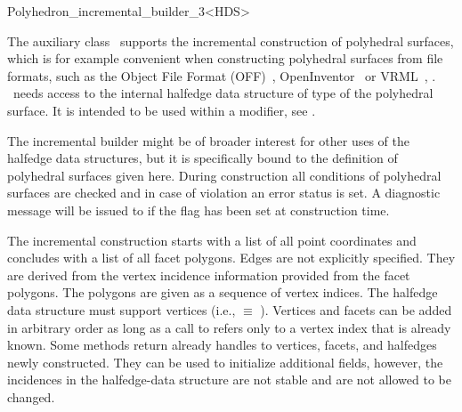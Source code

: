 
\ccRefPageBegin



\begin{ccRefClass}{Polyhedron_incremental_builder_3<HDS>}
\label{pagePolyIncrBuilder}

\ccDefinition
{}
  
The auxiliary class \ccClassTemplateName\ supports the incremental
construction of polyhedral surfaces, which is for example convenient
when constructing polyhedral surfaces from file formats, such as the
Object File Format (OFF)~\cite{cgal:p-gmgv16-96},
OpenInventor~\cite{cgal:w-impoo-94} or 
VRML~\cite{cgal:bpp-vrml-95}, \cite{cgal:vrmls-96}.
\ccClassTemplateName\ needs access to the internal halfedge data
structure of type  of the polyhedral surface. It is intended
to be used within a modifier, see .

The incremental builder might be of broader interest for other uses of
the halfedge data structures, but it is specifically bound to the
definition of polyhedral surfaces given here. During construction all
conditions of polyhedral surfaces are checked and in case of violation
an error status is set. A diagnostic message will be issued to
 if the  flag has been set at construction
time.

The incremental construction starts with a list of all point
coordinates and concludes with a list of all facet polygons. Edges are
not explicitly specified. They are derived from the vertex incidence
information provided from the facet polygons. The polygons are given as a
sequence of vertex indices.  The halfedge data structure  must
support vertices (i.e.,  $\equiv$
). Vertices and facets can be added in arbitrary order
as long as a call to  refers only to a
vertex index that is already known. Some methods return already
handles to vertices, facets, and halfedges newly constructed. They can
be used to initialize additional fields, however, the incidences in
the halfedge-data structure are not stable and are not allowed to be
changed.


\end{ccRefClass}
